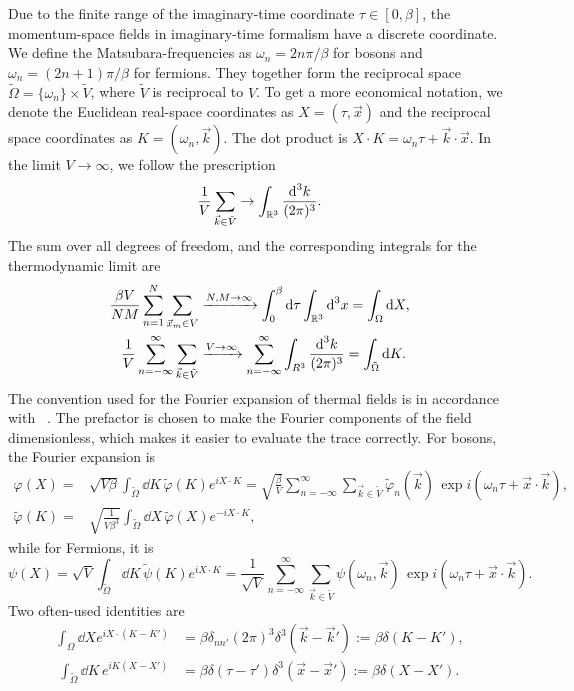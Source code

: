 Due to the finite range of the imaginary-time coordinate $\tau \in [0, \beta]$, the momentum-space fields in imaginary-time formalism have a discrete coordinate. 
We define the Matsubara-frequencies as $\omega_n = 2 n \pi / \beta$ for bosons and $\omega_n = (2n + 1) \pi / \beta$ for fermions.
They together form the reciprocal space $\tilde \Omega = \{\omega_n\}\times \tilde V$, where $\tilde V$ is reciprocal to $V$.
To get a more economical notation, we denote the Euclidean real-space coordinates as $X = (\tau, \vec x)$ and the reciprocal space coordinates as $K = (\omega_n, \vec k)$.
The dot product is $X\cdot K = \omega_n \tau + \vec k \cdot \vec x$.
In the limit $V\rightarrow \infty$, we follow the prescription
%
\begin{equation}
    \frac{1}{V} \sum_{\vec k \in \tilde V} \rightarrow \int_{\mathbb{R}^3} 
    \frac{\text{d}^3 k}{(2 \pi)^3}.
\end{equation}
The sum over all degrees of freedom, and the corresponding integrals for the thermodynamic limit are
%
\begin{align}
     \frac{\beta V}{NM}\sum_{n=1}^N \sum_{\vec x_m \in V} 
    & \xrightarrow{N,M\rightarrow \infty} \int_{0}^\beta \text{d} \tau \int_{\mathbb{R}^3} \text{d}^3 x
    = \int_\Omega \text{d} X, \\
     \frac{1}{V} \sum_{n=-\infty}^\infty \sum_{\vec k \in \tilde V}
    & \xrightarrow{V \rightarrow \infty} \sum_{n=-\infty}^\infty \int_{R^3} \frac{\text{d}^3 k}{(2 \pi)^3}
    = \int_{\tilde \Omega} \text{d} K.
\end{align}
%
The convention used for the Fourier expansion of thermal fields is in accordance with ~\autocite{kapustaFiniteTemperatureFieldTheory2006}. 
The prefactor is chosen to make the Fourier components of the field dimensionless, which makes it easier to evaluate the trace correctly.
For bosons, the Fourier expansion is
%
\begin{align}
    \varphi(X)
    = &
    \sqrt{V \beta} \int_{\tilde \Omega} \dd K \,  \tilde \varphi(K) e^{i X\cdot K}
    =
    \sqrt{\frac{\beta}{V}} \sum_{n=-\infty}^\infty \sum_{\vec k \in \tilde V}
    \tilde \varphi_n(\vec k)\, \exp{i(\omega_n \tau + \vec x \cdot \vec k)}, \\
    \tilde \varphi(K)
    = &
    \sqrt{\frac{1}{V \beta^3}} \int_{\tilde \Omega} \dd X \,  \tilde \varphi(X) e^{ - i X\cdot K},
\end{align}
%
while for Fermions, it is
%
\begin{equation}
    \psi(X) 
    = \sqrt{V} \int_{\tilde \Omega} \dd K \, \tilde \psi(K) e^{i X\cdot K} 
    = \frac{1}{\sqrt{V}} \sum_{n = - \infty}^\infty \sum_{\vec k \in \tilde V}
    \psi(\omega_n, \vec k) \, \exp{i(\omega_n \tau + \vec x \cdot \vec k)}.
\end{equation}
%
Two often-used identities are
%
\begin{align}
    \label{thermal delta}
    \int_{\Omega} \dd X e^{i X\cdot(K - K')} 
    & = \beta \delta_{nn'} (2 \pi)^3 \delta^3(\vec k - \vec k') := \beta \delta(K - K'), \\\
    \int_{\tilde \Omega} \dd K \, e^{i K(X - X')} 
    & = \beta \delta (\tau - \tau') \delta^3(\vec x - \vec x') 
    := \beta \delta(X - X').
\end{align}
%
